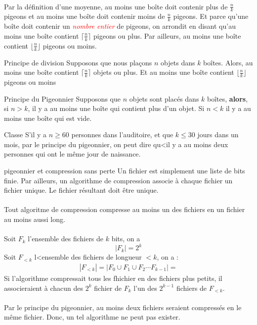 \documentclass[8pt]{report}
\begin{document}
\begin{multicols*}{2}
        \paragraph{}
        Par la définition d'une moyenne, 
        au moins une boîte doit contenir plus de $\frac{n}{k}$ pigeons et au moins une boîte doit contenir 
        moins de $\frac{n}{k}$ pigeons. Et parce qu'une boîte doit contenir un 
        \textcolor{red}{\textit{nombre entier}} de pigeons, on arrondit en disant qu'au moins une boîte 
        contient  $\lceil \frac{n}{k} \rceil$ pigeons ou plus. Par ailleurs, au moins  une boîte 
        contient  $\lfloor \frac{n}{k} \rfloor$ pigeons ou moins. 

\begin{Definitionx*}{Principe de division}{}
    Supposons que nous plaçons $n$ objets dans $k$ boîtes. Alors, au moins une boîte
    contient $\lceil \frac{n}{k} \rceil$ objets ou plus. Et au moins une boîte contient  
    $\lfloor \frac{n}{k} \rfloor$ pigeons ou moins
\end{Definitionx*}

\begin{Definitionx*}{Principe du Pigeonnier}{}
    Supposons que $n$ objets sont placés dans $k$ boîtes, \textbf{alors}, si $n > k$, il y a au moins une 
    boîte qui contient plus d'un objet. Si $n < k$ il y a au moins une boîte qui est vide. 
\end{Definitionx*}
\begin{EExample}{Classe}{}
    S'il y a $n \geq 60$ personnes dans l'auditoire, et que $k \leq 30$ jours dans un mois,
    par le principe du pigeonnier, on peut dire qu<il y a au moins deux personnes qui ont 
    le même jour de naissance. 
\end{EExample}

\begin{EExample}{pigeonnier et compression sans perte}{}
    Un fichier est simplement une liste de bits finie. Par ailleurs, un algorithme de compression 
    associe à chaque fichier un fichier unique. Le fichier résultant doit être unique.  \\\\
    Tout algoritme de compression compresse au moins un des fichiers en un fichier au moins aussi long.
    \\\\
    Soit $F_k$ l'ensemble des fichiers de $k$ bits, on a 
    \[ |F_k| = 2^k\]
    Soit $F_{<k}$ l<ensemble des fichiers de longueur $< k$, on a :
    \begin{align*}
             |F_{<k}| = |F_0 \cup F_1 \cup F_2 \cdots F_{k-1}| =       
    \end{align*}
    Si l'algorithme compressait tous les fhichier en des fichiers plus petits, il associeraient 
    à chacun des $2^k$ fichier de $F_k$ l'un des $2^{k-1}$ fichiers de $F_{<k}$. \\\\
    Par le principe du pigeonnier, au moins deux fichiers seraient compressés en le même fichier. Donc,
    un tel algorithme ne peut pas exister. 
\end{EExample}


\end{multicols*}
\end{document}
